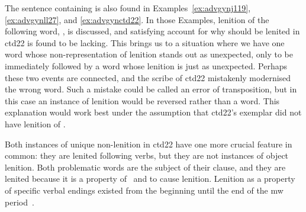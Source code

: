 \begin{mwl}
\end{mwl}
The sentence containing  is also found in Examples~\ref{ex:advgynj119}, \ref{ex:advgynll27}, and \ref{ex:advgynctd22}. In those Examples, lenition of the following word, , is discussed, and satisfying account for why  should be lenited in \gls{ctd22} is found to be lacking. This brings us to a situation where we have one word whose non-representation of lenition stands out as unexpected, only to be immediately followed by a word whose lenition is just as unexpected. Perhaps these two events are connected, and the scribe of \gls{ctd22} mistakenly modernised the wrong word. Such a mistake could be called an error of transposition, but in this case an instance of lenition would be reversed rather than a word. This explanation would work best under the assumption that \gls{ctd22}'s exemplar did not have lenition of .

Both instances of unique non-lenition in \gls{ctd22} have one more crucial feature in common: they are lenited following verbs, but they are not instances of object lenition. Both problematic words are the subject of their clause, and they are lenited because it is a property of \ei\ and  to cause lenition. Lenition as a property of specific verbal endings existed from the beginning until the end of the \gls{mw} period~\autocite[42]{van_development14}.

